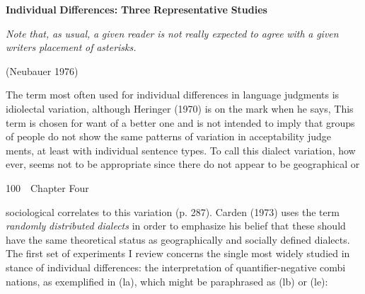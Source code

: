 \setcounter{listWWNumxliiileveli}{3}
\begin{listWWNumxliiileveli}
\item 
\setcounter{listWWNumxliiilevelii}{1}
\begin{listWWNumxliiilevelii}
\item 
\begin{styleStandard}
\textbf{Individual}\textbf{ }\textbf{Differences:}\textbf{ }\textbf{Three}\textbf{ }\textbf{Representative}\textbf{ }\textbf{Studies}
\end{styleStandard}


\end{listWWNumxliiilevelii}
\end{listWWNumxliiileveli}
\begin{styleStandard}
\textit{Note}\textit{ }\textit{that,}\textit{ }\textit{as}\textit{ }\textit{usual,}\textit{ }\textit{a}\textit{ }\textit{given}\textit{ }\textit{reader}\textit{ }\textit{is}\textit{ }\textit{not}\textit{ }\textit{really expected}\textit{ }\textit{to}\textit{ }\textit{agree}\textit{ }\textit{with}\textit{ }\textit{a}\textit{ }\textit{given}\textit{ }\textit{writer{\textquotesingle}s}\textit{ }\textit{placement}\textit{ }\textit{of}\textit{ }\textit{asterisks.}
\end{styleStandard}


\begin{styleStandard}
(Neubauer 1976)
\end{styleStandard}


\begin{styleStandard}
The term most often used for individual differences in language judgments is idiolectal variation, although Heringer (1970) is on the mark when he says, {\textquotedbl}This term is chosen for want of a better one and is not intended to imply that groups of people do not show the same patterns of variation in acceptability judge\- ments, at least with individual sentence types. To call this dialect variation, how\- ever, seems not to be appropriate since there do not appear to be geographical or
\end{styleStandard}


\clearpage\setcounter{page}{1}\begin{styleStandard}
100\ \ Chapter Four
\end{styleStandard}


\begin{styleTextbody}
sociological correlates to this variation{\textquotedbl} (p. 287). Carden (1973) uses the term \textit{randomly}\textit{ }\textit{distributed}\textit{ }\textit{dialects}\textit{ }in order to emphasize his belief that these should have the same theoretical status as geographically and socially defined dialects. The first set of experiments I review concerns the single most widely studied in\- stance of individual differences: the interpretation of quantifier-negative combi\- nations, as exemplified in (la), which might be paraphrased as (lb) or (le):
\end{styleTextbody}


